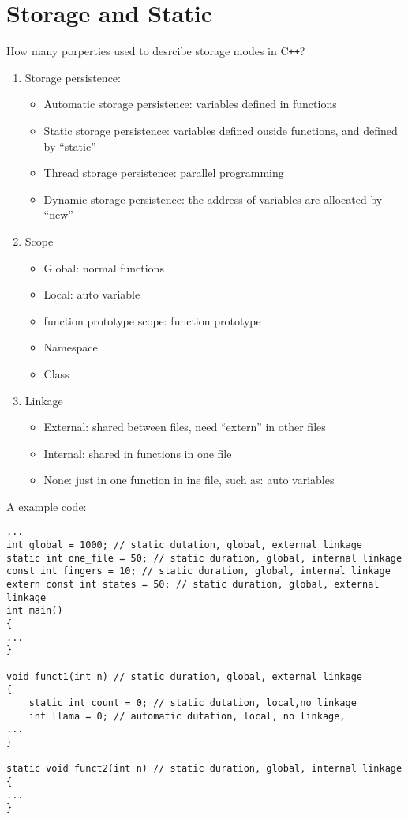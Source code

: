 \documentclass[10pt,a4paper,oneside]{article}
\begin{document}
\section{Storage and Static}
How many porperties used to desrcibe storage modes in C\texttt{++}?
\begin{enumerate}[1.]
\item Storage persistence:
\begin{itemize}
\item Automatic storage persistence: variables defined in functions
\item Static storage persistence: variables defined ouside functions, and defined by ``static'' 
\item Thread storage persistence: parallel programming
\item Dynamic storage persistence: the address of variables are allocated by ``new''
\end{itemize}
\item Scope
\begin{itemize}
	\item Global: normal functions
	\item Local: auto variable
	\item function prototype scope: function prototype
	\item Namespace
	\item Class
\end{itemize}
\item Linkage
\begin{itemize}
	\item External: shared between files, need ``extern'' in other files
	\item Internal: shared in functions in one file
	\item None: just in one function in ine file, such as: auto variables
\end{itemize}
\end{enumerate}
A example code:
\begin{lstlisting}
...
int global = 1000; // static dutation, global, external linkage
static int one_file = 50; // static duration, global, internal linkage
const int fingers = 10; // static duration, global, internal linkage
extern const int states = 50; // static duration, global, external linkage
int main()
{
...
}

void funct1(int n) // static duration, global, external linkage
{
    static int count = 0; // static dutation, local,no linkage
    int llama = 0; // automatic dutation, local, no linkage, 
...
}

static void funct2(int n) // static duration, global, internal linkage
{
...
}
\end{lstlisting}
\end{document}
